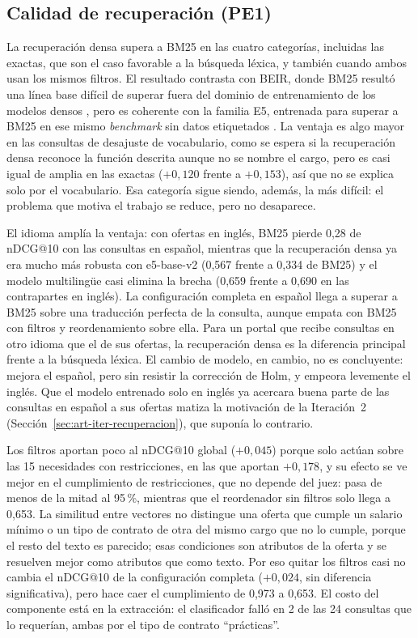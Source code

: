 \subsection{Calidad de recuperación (PE1)}
\label{sec:disc-pe1}

La recuperación densa supera a BM25 en las cuatro categorías, incluidas las exactas, que son el caso favorable a la búsqueda léxica, y también cuando ambos usan los mismos filtros. El resultado contrasta con BEIR, donde BM25 resultó una línea base difícil de superar fuera del dominio de entrenamiento de los modelos densos \citep{Thakur2021}, pero es coherente con la familia E5, entrenada para superar a BM25 en ese mismo \textit{benchmark} sin datos etiquetados \citep{Wang2022E5}. La ventaja es algo mayor en las consultas de desajuste de vocabulario, como se espera si la recuperación densa reconoce la función descrita aunque no se nombre el cargo, pero es casi igual de amplia en las exactas ($+0{,}120$ frente a $+0{,}153$), así que no se explica solo por el vocabulario. Esa categoría sigue siendo, además, la más difícil: el problema que motiva el trabajo se reduce, pero no desaparece.

El idioma amplía la ventaja: con ofertas en inglés, BM25 pierde 0,28 de nDCG@10 con las consultas en español, mientras que la recuperación densa ya era mucho más robusta con e5-base-v2 (0,567 frente a 0,334 de BM25) y el modelo multilingüe casi elimina la brecha (0,659 frente a 0,690 en las contrapartes en inglés). La configuración completa en español llega a superar a BM25 sobre una traducción perfecta de la consulta, aunque empata con BM25 con filtros y reordenamiento sobre ella. Para un portal que recibe consultas en otro idioma que el de sus ofertas, la recuperación densa es la diferencia principal frente a la búsqueda léxica. El cambio de modelo, en cambio, no es concluyente: mejora el español, pero sin resistir la corrección de Holm, y empeora levemente el inglés. Que el modelo entrenado solo en inglés ya acercara buena parte de las consultas en español a sus ofertas matiza la motivación de la Iteración~2 (Sección~\ref{sec:art-iter-recuperacion}), que suponía lo contrario.

Los filtros aportan poco al nDCG@10 global ($+0{,}045$) porque solo actúan sobre las 15 necesidades con restricciones, en las que aportan $+0{,}178$, y su efecto se ve mejor en el cumplimiento de restricciones, que no depende del juez: pasa de menos de la mitad al 95\,\%, mientras que el reordenador sin filtros solo llega a 0,653. La similitud entre vectores no distingue una oferta que cumple un salario mínimo o un tipo de contrato de otra del mismo cargo que no lo cumple, porque el resto del texto es parecido; esas condiciones son atributos de la oferta y se resuelven mejor como atributos que como texto. Por eso quitar los filtros casi no cambia el nDCG@10 de la configuración completa ($+0{,}024$, sin diferencia significativa), pero hace caer el cumplimiento de 0,973 a 0,653. El costo del componente está en la extracción: el clasificador falló en 2 de las 24 consultas que lo requerían, ambas por el tipo de contrato \enquote{prácticas}.

